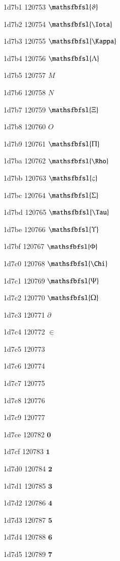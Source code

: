 \documentclass[11pt]{article}
\begin{document}
1d7b1 120753 \ensuremath{\mathsfbfsl{\vartheta}}

1d7b2 120754 \ensuremath{\mathsfbfsl{\Iota}}

1d7b3 120755 \ensuremath{\mathsfbfsl{\Kappa}}

1d7b4 120756 \ensuremath{\mathsfbfsl{\Lambda}}

1d7b5 120757 \ensuremath{M}

1d7b6 120758 \ensuremath{N}

1d7b7 120759 \ensuremath{\mathsfbfsl{\Xi}}

1d7b8 120760 \ensuremath{O}

1d7b9 120761 \ensuremath{\mathsfbfsl{\Pi}}

1d7ba 120762 \ensuremath{\mathsfbfsl{\Rho}}

1d7bb 120763 \ensuremath{\mathsfbfsl{\varsigma}}

1d7bc 120764 \ensuremath{\mathsfbfsl{\Sigma}}

1d7bd 120765 \ensuremath{\mathsfbfsl{\Tau}}

1d7be 120766 \ensuremath{\mathsfbfsl{\Upsilon}}

1d7bf 120767 \ensuremath{\mathsfbfsl{\Phi}}

1d7c0 120768 \ensuremath{\mathsfbfsl{\Chi}}

1d7c1 120769 \ensuremath{\mathsfbfsl{\Psi}}

1d7c2 120770 \ensuremath{\mathsfbfsl{\Omega}}

1d7c3 120771 \ensuremath{\partial}

1d7c4 120772 \ensuremath{\in}

1d7c5 120773 \mathsfbfsl{\vartheta}

1d7c6 120774 \mathsfbfsl{\varkappa}

1d7c7 120775 \mathsfbfsl{\phi}

1d7c8 120776 \mathsfbfsl{\varrho}

1d7c9 120777 \mathsfbfsl{\varpi}

1d7ce 120782 \ensuremath{\mathbf{0}}

1d7cf 120783 \ensuremath{\mathbf{1}}

1d7d0 120784 \ensuremath{\mathbf{2}}

1d7d1 120785 \ensuremath{\mathbf{3}}

1d7d2 120786 \ensuremath{\mathbf{4}}

1d7d3 120787 \ensuremath{\mathbf{5}}

1d7d4 120788 \ensuremath{\mathbf{6}}

1d7d5 120789 \ensuremath{\mathbf{7}}
\end{document}

